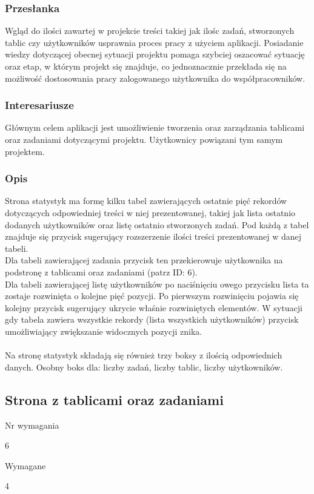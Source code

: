 \documentclass[eng,printmode]{mgr}
\begin{document}
\subsubsection{Przesłanka}
Wgląd do ilości zawartej w projekcie treści takiej jak ilośc zadań, stworzonych tablic czy użytkowników  usprawnia proces pracy z użyciem aplikacji. Posiadanie wiedzy dotyczącej obecnej sytuacji projektu pomaga szybciej oszacować sytuację oraz etap, w którym projekt się znajduje, co jednoznacznie przekłada się na możliwość dostosowania pracy zalogowanego użytkownika do współpracowników.

\subsubsection{Interesariusze}
Głównym celem aplikacji jest umożliwienie tworzenia oraz zarządzania tablicami oraz zadaniami dotyczącymi projektu. Użytkownicy powiązani tym samym projektem.

\subsubsection{Opis}
Strona statystyk ma formę kilku tabel zawierających ostatnie pięć rekordów dotyczących odpowiedniej treści w niej prezentowanej, takiej jak lista ostatnio dodanych użytkowników oraz listę ostatnio stworzonych zadań. Pod każdą z tabel znajduje się przycisk sugerujący rozszerzenie ilości treści prezentowanej w danej tabeli.
\\
Dla tabeli zawierającej zadania przycisk ten przekierowuje użytkownika na podstronę z tablicami oraz zadaniami (patrz ID: 6). 
\\
Dla tabeli zawierającej listę użytkowników po naciśnięciu owego przycisku lista ta zostaje rozwinięta o kolejne pięć pozycji. Po pierwszym rozwinięciu pojawia się kolejny przycisk sugerujący ukrycie właśnie rozwiniętych elementów. W sytuacji gdy tabela zawiera wszystkie rekordy (lista wszystkich użytkowników) przycisk umożliwiający zwiększanie widocznych pozycji znika.
\\ \\
Na stronę statystyk składają się również trzy boksy z ilością odpowiednich danych. Osobny boks dla: liczby zadań, liczby tablic, liczby użytkowników.
\newpage

\subsection{Strona z tablicami oraz zadaniami}
\begin{labeling}{Nr wymagania}
\item [Nr wymagania:] 6
\item [Priorytet:] Wymagane
\item [Powiązania:] 4
\end{labeling}
\end{document}

